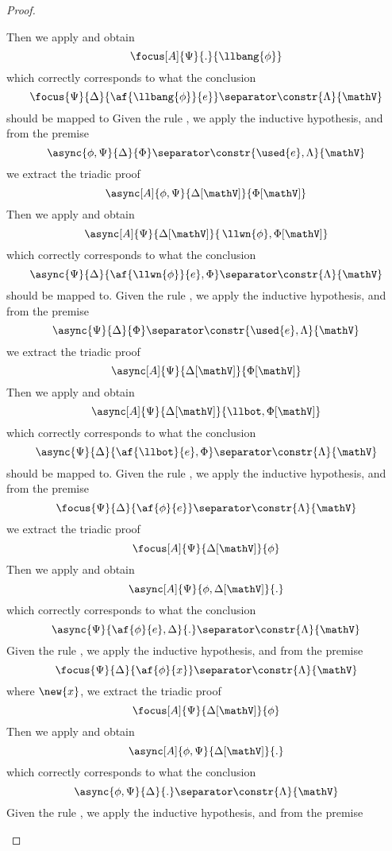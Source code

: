 \begin{proof}
\begin{itemize}
			Then we apply \derRule[A]{\displaybang} and obtain
			$$ \focus[A]{\Psi}{.}{\llbang{\phi}} $$
			which correctly corresponds to what the conclusion 
			$$ \focus{\Psi}{\Delta}{\af{\llbang{\phi}}{e}} \separator \constr{\Lambda}{\mathV} $$
			should be mapped to
		\indCase{\displaywn} Given the rule \derRule{\displaywn}, we apply the inductive hypothesis, and from the premise
			$$ \async{\phi, \Psi}{\Delta}{\Phi} \separator \constr{\used{e}, \Lambda}{\mathV} $$
			we extract the triadic proof
			$$ \async[A]{\phi, \Psi}{\Delta[\mathV]}{\Phi[\mathV]}$$
			Then we apply \derRule[A]{\displaywn} and obtain
			$$ \async[A]{\Psi}{\Delta[\mathV]}{\,\llwn{\phi}, \Phi[\mathV]} $$
			which correctly corresponds to what the conclusion
			$$ \async{\Psi}{\Delta}{\af{\llwn{\phi}}{e}, \Phi} \separator \constr{\Lambda}{\mathV} $$
			should be mapped to.
		\indCase{\displaybot} Given the rule \derRule{\displaybot}, we apply the inductive hypothesis, and from the premise
			$$ \async{\Psi}{\Delta}{\Phi} \separator \constr{\used{e}, \Lambda}{\mathV} $$
			we extract the triadic proof
			$$ \async[A]{\Psi}{\Delta[\mathV]}{\Phi[\mathV]} $$
			Then we apply \derRule[A]{\displaybot} and obtain
			$$ \async[A]{\Psi}{\Delta[\mathV]}{\llbot, \Phi[\mathV]} $$
			which correctly corresponds to what the conclusion
			$$ \async{\Psi}{\Delta}{\af{\llbot}{e}, \Phi} \separator \constr{\Lambda}{\mathV} $$
			should be mapped to.
		\indCase{\displaydecide[1]} Given the rule \derRule{\displaydecide[1]}, we apply the inductive hypothesis, and from the premise
			$$ \focus{\Psi}{\Delta}{\af{\phi}{e}} \separator \constr{\Lambda}{\mathV} $$
			we extract the triadic proof
			$$ \focus[A]{\Psi}{\Delta[\mathV]}{\phi} $$
			Then we apply \derRule[A]{\displaydecide[1]} and obtain
			$$ \async[A]{\Psi}{\phi, \Delta[\mathV]}{.} $$
			which correctly corresponds to what the conclusion
			$$ \async{\Psi}{\af{\phi}{e}, \Delta}{.} \separator \constr{\Lambda}{\mathV} $$
		\indCase{\displaydecide[2]} Given the rule \derRule{\displaydecide[2]}, we apply the inductive hypothesis, and from the premise
			$$ \focus{\Psi}{\Delta}{\af{\phi}{x}} \separator \constr{\Lambda}{\mathV} $$
			where $\new{x}$, we extract the triadic proof
			$$ \focus[A]{\Psi}{\Delta[\mathV]}{\phi} $$
			Then we apply \derRule[A]{\displaydecide[2]} and obtain
			$$ \async[A]{\phi, \Psi}{ \Delta[\mathV]}{.} $$
			which correctly corresponds to what the conclusion
			$$ \async{\phi, \Psi}{\Delta}{.} \separator \constr{\Lambda}{\mathV} $$
		\indCase{\displaytodelta} Given the rule \derRule{\displaytodelta}, we apply the inductive hypothesis, and from the premise

\end{itemize}
\end{proof}
